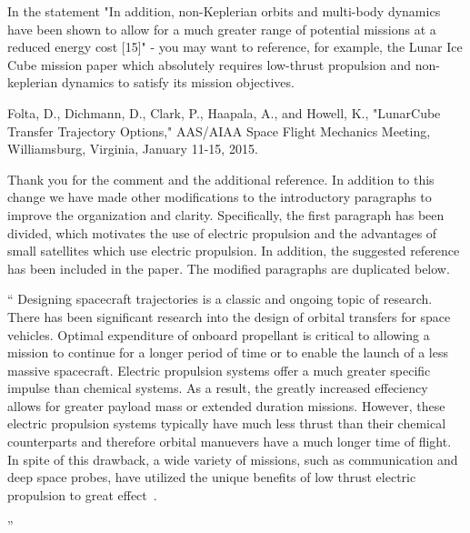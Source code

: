 \documentclass[11pt]{article}
\newenvironment{correction}{\begin{list}{}{\setlength{\leftmargin}{1cm}\setlength{\rightmargin}{1cm}}\vspace{\parsep}\item[]``}{''\end{list}}
\begin{document}
\begin{enumerate}
    \item
        \begin{itshape}
            In the statement "In addition, non-Keplerian orbits and multi-body dynamics have been shown to allow for a much greater range of potential
            missions at a reduced energy cost [15]" - you may want to reference, for example, the Lunar Ice Cube mission paper which absolutely requires low-thrust propulsion and non-keplerian dynamics to satisfy its mission objectives.

            Folta, D., Dichmann, D., Clark, P., Haapala, A., and Howell, K., "LunarCube Transfer Trajectory Options," AAS/AIAA Space Flight Mechanics Meeting, Williamsburg, Virginia, January 11-15, 2015.
        \end{itshape}
        
        Thank you for the comment and the additional reference.
        In addition to this change we have made other modifications to the introductory paragraphs to improve the organization and clarity.
        Specifically, the first paragraph has been divided, which motivates the use of electric propulsion and the advantages of small satellites which use electric propulsion.
        In addition, the suggested reference has been included in the paper.
        The modified paragraphs are duplicated below.

        \begin{correction}
            Designing spacecraft trajectories is a classic and ongoing topic of research.
            There has been significant research into the design of orbital transfers for space vehicles.
            Optimal expenditure of onboard propellant is critical to allowing a mission to continue for a longer period of time or to enable the launch of a less massive spacecraft.
            Electric propulsion systems offer a much greater specific impulse than chemical systems.
            As a result, the greatly increased effeciency allows for greater payload mass or extended duration missions.
            However, these electric propulsion systems typically have much less thrust than their chemical counterparts and therefore orbital manuevers have a much longer time of flight.
            In spite of this drawback, a wide variety of missions, such as communication and deep space probes, have utilized the unique benefits of low thrust electric propulsion to great effect~\cite{choueiri2009}.


\end{correction}
\end{enumerate}
\end{document}
